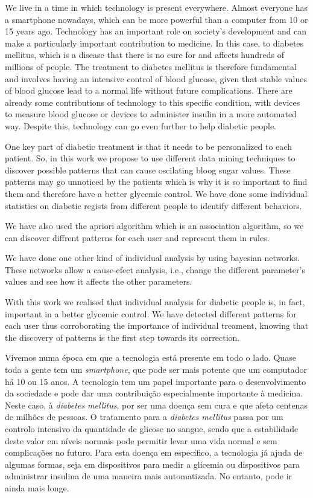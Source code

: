 


We live in a time in which technology is present everywhere. Almost everyone has a smartphone nowadays, which can be more powerful than a computer from 10 or 15 years ago. Technology has an important role on society's development and can make a particularly important contribution to medicine. In this case, to diabetes mellitus, which is a disease that there is no cure for and affects hundreds of millions of people. The treatment to diabetes mellitus is therefore fundamental and involves having an intensive control of blood glucose, given that stable values of blood glucose lead to a normal life without future complications. There are already some contributions of technology to this specific condition, with devices to measure blood glucose or devices to administer insulin in a more automated way. Despite this, technology can go even further to help diabetic people.

One key part of diabetic treatment is that it needs to be personalized to each patient. So, in this work we propose to use different data mining techniques to discover possible patterns that can cause oscilating bloog sugar values. These patterns may go unnoticed by the patients which is why it is so important to find them and therefore have a better glycemic control. We have done some individual statistics on diabetic regists from different people to identify different behaviors.

We have also used the apriori algorithm which is an association algorithm, so we can discover diffrent patterns for each user and represent them in rules.

We have done one other kind of individual analysis by using bayesian networks. These networks allow a cause-efect analysis, i.e., change the different parameter's values and see how it affects the other parameters.

With this work  we realised that individual analysis for diabetic people is, in fact, important in a better glycemic control. We have detected different patterns for each user thus corroborating the importance of individual treament, knowing that the discovery of patterns is the first step towards its correction.


Vivemos numa época em que a tecnologia está presente em todo o lado. Quase toda a gente tem um \textit{smartphone}, que pode ser mais potente que um computador há 10 ou 15 anos. A tecnologia tem um papel importante para o desenvolvimento da sociedade e pode dar uma contribuição especialmente importante à medicina. Neste caso, à \textit{diabetes mellitus}, por ser uma doença sem cura e que afeta centenas de milhões de pessoas. O tratamento para a \textit{diabetes mellitus} passa por um controlo intensivo da quantidade de glicose no sangue, sendo que a estabilidade deste valor em níveis normais pode permitir levar uma vida normal e sem complicações no futuro. Para esta doença em específico, a tecnologia já ajuda de algumas formas, seja em dispositivos para medir a glicemia ou dispositivos para administrar insulina de uma maneira mais automatizada. No entanto, pode ir ainda mais longe.

